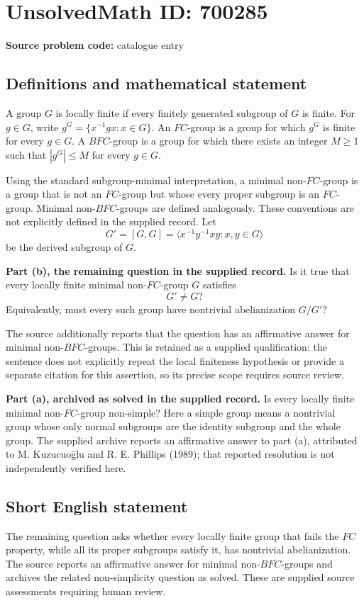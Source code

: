 \documentclass[11pt]{article}
\begin{document}
\section*{UnsolvedMath ID: 700285}
\textbf{Source problem code:} catalogue entry
\subsection{Definitions and mathematical statement}
A group \(G\) is locally finite if every finitely generated subgroup of \(G\) is finite. For \(g\in G\), write \(g^G=\{x^{-1}gx:x\in G\}\). An \(FC\)-group is a group for which \(g^G\) is finite for every \(g\in G\). A \(BFC\)-group is a group for which there exists an integer \(M\geq 1\) such that \(|g^G|\leq M\) for every \(g\in G\).

Using the standard subgroup-minimal interpretation, a minimal non-\(FC\)-group is a group that is not an \(FC\)-group but whose every proper subgroup is an \(FC\)-group. Minimal non-\(BFC\)-groups are defined analogously. These conventions are not explicitly defined in the supplied record. Let
\[
G'=[G,G]=\langle x^{-1}y^{-1}xy:x,y\in G\rangle
\]
be the derived subgroup of \(G\).

\textbf{Part (b), the remaining question in the supplied record.} Is it true that every locally finite minimal non-\(FC\)-group \(G\) satisfies
\[
G'\neq G?
\]
Equivalently, must every such group have nontrivial abelianization \(G/G'\)?

The source additionally reports that the question has an affirmative answer for minimal non-\(BFC\)-groups. This is retained as a supplied qualification: the sentence does not explicitly repeat the local finiteness hypothesis or provide a separate citation for this assertion, so its precise scope requires source review.

\textbf{Part (a), archived as solved in the supplied record.} Is every locally finite minimal non-\(FC\)-group non-simple? Here a simple group means a nontrivial group whose only normal subgroups are the identity subgroup and the whole group. The supplied archive reports an affirmative answer to part (a), attributed to M. Kuzucuo\=glu and R. E. Phillips (1989); that reported resolution is not independently verified here.
\subsection{Short English statement}
The remaining question asks whether every locally finite group that fails the \(FC\) property, while all its proper subgroups satisfy it, has nontrivial abelianization. The source reports an affirmative answer for minimal non-\(BFC\)-groups and archives the related non-simplicity question as solved. These are supplied source assessments requiring human review.
\end{document}
